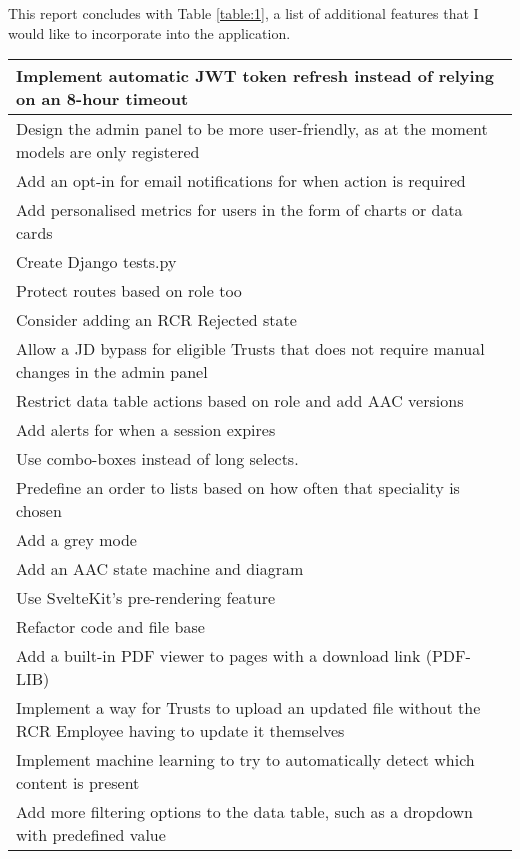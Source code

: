 This report concludes with Table \ref{table:1}, a list of additional features that I would like to incorporate into the application.

\def\arraystretch{1.22}
\begin{table}[h!]
\small
\vspace{-20pt}
\centering
\begin{tabular}{||m{}||}
   \hline
 Implement automatic JWT token refresh instead of relying on an 8-hour timeout\\ 
\hline
 Design the admin panel to be more user-friendly, as at the moment models are only registered\\
\hline
 Add an opt-in for email notifications for when action is required\\
\hline
 Add personalised metrics for users in the form of charts or data cards\\
\hline
 Create Django tests.py\\
\hline
 Protect routes based on role too\\
\hline
 Consider adding an RCR Rejected state\\
\hline
 Allow a JD bypass for eligible Trusts that does not require manual changes in the admin panel\\ 
\hline
 Restrict data table actions based on role and add AAC versions\\ 
\hline
 Add alerts for when a session expires\\ 
\hline
 Use combo-boxes instead of long selects.\\ 
\hline
  Predefine an order to lists based on how often that speciality is chosen\\ 
\hline
 Add a grey mode\\ 
\hline
 Add an AAC state machine and diagram\\ 
\hline
 Use SvelteKit's pre-rendering feature\\ 
\hline
 Refactor code and file base\\ 
\hline
  Add a built-in PDF viewer to pages with a download link (PDF-LIB)\\ 
\hline
  Implement a way for Trusts to upload an updated file without the RCR Employee having to update it themselves\\ 
\hline
 Implement machine learning to try to automatically detect which content is present\\ 
\hline
  Add more filtering options to the data table, such as a dropdown with predefined value\\ 

\end{tabular}
\end{table}
